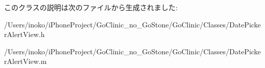 このクラスの説明は次のファイルから生成されました:\begin{DoxyCompactItemize}
\item 
/Users/inoko/iPhoneProject/GoClinic\_\-no\_\-GoStone/GoClinic/Classes/DatePickerAlertView.h\item 
/Users/inoko/iPhoneProject/GoClinic\_\-no\_\-GoStone/GoClinic/Classes/DatePickerAlertView.m\end{DoxyCompactItemize}

